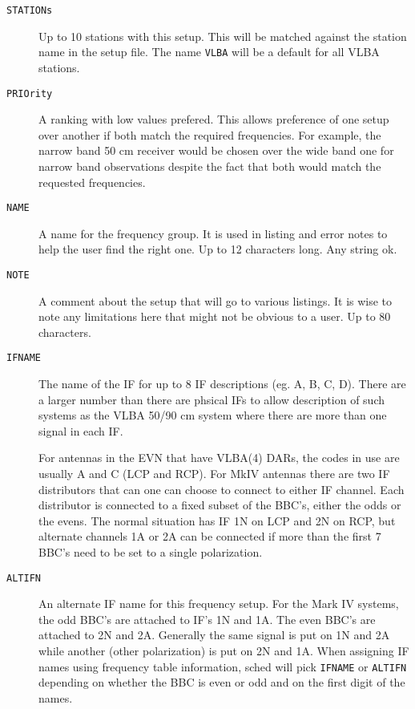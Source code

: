 \documentclass{report}
\begin{document}
\begin{description}

\item [{\tt STATIONs}] Up to 10 stations with this setup.  This will
be matched against the station name in the setup file.  The name
{\tt VLBA} will be a default for all VLBA stations.

\item [{\tt PRIOrity}] A ranking with low values prefered.  This
allows preference of one setup over another if both match the
required frequencies.  For example, the narrow band 50 cm receiver
would be chosen over the wide band one for narrow band observations
despite the fact that both would match the requested frequencies.

\item [{\tt NAME}] A name for the frequency group.  It is used
in listing and error notes to help the user find the right one.
Up to 12 characters long.  Any string ok.

\item [{\tt NOTE}]  A comment about the setup that will go to
various listings.  It is wise to note any limitations here that
might not be obvious to a user.  Up to 80 characters.

\item [{\tt IFNAME}] The name of the IF for up to 8 IF descriptions
(eg. A, B, C, D).  There are a larger number than there are phsical IFs
to allow description of such systems as the VLBA 50/90 cm system
where there are more than one signal in each IF.

For antennas in the EVN that have VLBA(4) DARs, the codes in use are
usually A and C (LCP and RCP). For MkIV antennas there are two IF
distributors that can one can choose to connect to either IF channel.
Each distributor is connected to a fixed subset of the BBC's, either
the odds or the evens.  The normal situation has IF 1N on LCP and 2N
on RCP, but alternate channels 1A or 2A can be connected if more than
the first 7 BBC's need to be set to a single polarization.

\item[{\tt ALTIFN}]  An alternate IF name for this frequency setup.
For the Mark IV systems, the odd BBC's are attached to IF's 1N and
1A.  The even BBC's are attached to 2N and 2A.  Generally the
same signal is put on 1N and 2A while another (other polarization)
is put on 2N and 1A.  When assigning IF names using frequency table
information, sched will pick {\tt IFNAME} or {\tt ALTIFN} depending
on whether the BBC is even or odd and on the first digit of the
names.


\end{description}
\end{document}
